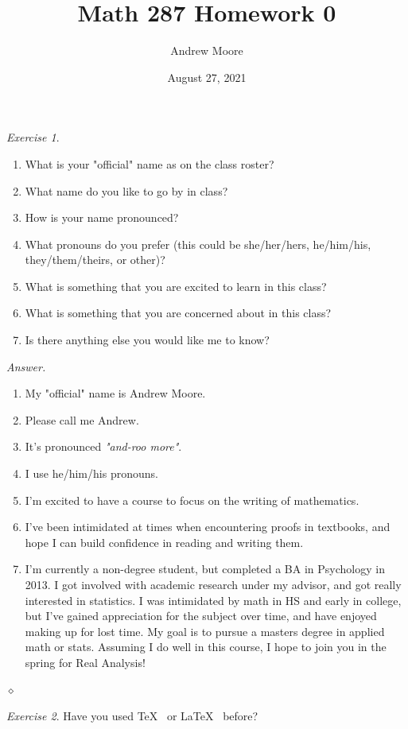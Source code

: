 \documentclass[12pt,oneside]{amsart}
\title{Math 287 Homework 0}
\author{Andrew Moore}
\date{August 27, 2021} %
\theoremstyle{remark}
\newtheorem{exer}{Exercise}
\newenvironment{answer}{\bigskip\noindent\emph{Answer.}}{\hfill$\diamond$\newline}
\begin{document}
\maketitle

\newpage
\begin{exer}
\begin{enumerate}
\item What is your "official" name as on the class roster?
\item What name do you like to go by in class?
\item How is your name pronounced?
\item What pronouns do you prefer (this could be she/her/hers, he/him/his, they/them/theirs, or other)?
\item What is something that you are excited to learn in this class?
\item What is something that you are concerned about in this class?
\item Is there anything else you would like me to know?
\end{enumerate}
\end{exer}

\begin{answer}
\begin{enumerate}
\item My "official" name is Andrew Moore.
\item Please call me Andrew.
\item It's pronounced \emph{"and-roo more"}.
\item I use he/him/his pronouns.
\item I'm excited to have a course to focus on the writing of mathematics.
\item I've been intimidated at times when encountering proofs in textbooks, and hope I can build confidence in reading and writing them.
\item I'm currently a non-degree student, but completed a BA in Psychology in 2013. I got involved with academic research under my advisor, and got really interested in statistics. I was intimidated by math in HS and early in college, but I've gained appreciation for the subject over time, and have enjoyed making up for lost time. My goal is to pursue a masters degree in applied math or stats. Assuming I do well in this course, I hope to join you in the spring for Real Analysis!
\end{enumerate}
\end{answer}

\newpage
\begin{exer}
Have you used \TeX~ or \LaTeX~ before?
\end{exer}
\end{document}
